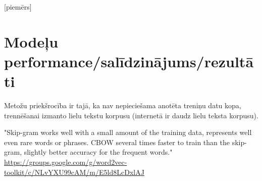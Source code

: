 [piemērs]


\cite{mccormick2016}


\section{Modeļu performance/salīdzinājums/rezultāti}

Metožu priekšrocība ir tajā, ka nav nepieciešama anotēta treniņu datu kopa, trennēšanai izmanto lielu tekstu korpusu (internetā ir daudz lielu teksta korpusu).


"Skip-gram works well with a small amount of the training data, represents well even rare words or phrases.
CBOW several times faster to train than the skip-gram, slightly better accuracy for the frequent words." 
\url{https://groups.google.com/g/word2vec-toolkit/c/NLvYXU99cAM/m/E5ld8LcDxlAJ}
